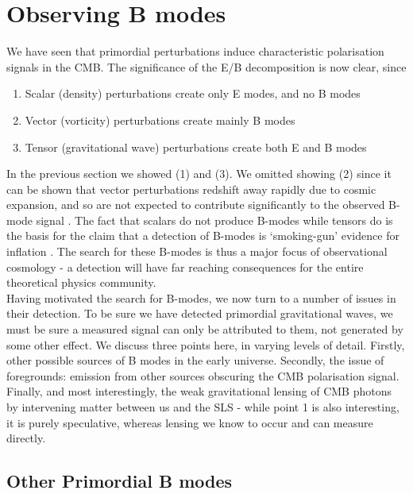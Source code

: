 \documentclass[a4paper,10pt]{article}
\begin{document}
\newpage
\section{Observing B modes}


We have seen that primordial perturbations induce characteristic polarisation signals in the CMB. The significance of the E/B decomposition is now clear, since

\begin{enumerate}
\item Scalar (density) perturbations create only E modes, and no B modes
\item Vector (vorticity) perturbations create mainly B modes
\item Tensor (gravitational wave) perturbations create both E and B modes
\end{enumerate}

In the previous section we showed (1) and (3). We omitted showing (2) since it can be shown that vector perturbations redshift away rapidly due to cosmic expansion, and so are not expected to contribute significantly to the observed B-mode signal  \cite{vector}. The fact that scalars do not produce B-modes while tensors do is the basis for the claim that a detection of B-modes is `smoking-gun'  evidence for inflation \cite{smokinggun}. The search for these B-modes is thus a major focus of observational cosmology - a detection will have far reaching consequences for the entire theoretical physics community. \\

Having motivated the search for B-modes, we now turn to a number of issues in their detection. To be sure we have detected primordial gravitational waves, we must be sure a measured signal can only be attributed to them, not generated by some other effect. We discuss three points here, in varying levels of detail. Firstly, other possible sources of B modes in the early universe. Secondly, the issue of foregrounds: emission from other sources obscuring the CMB polarisation signal. Finally, and most interestingly, the weak gravitational lensing of CMB photons by intervening matter between us and the SLS - while point 1 is also interesting, it is purely speculative, whereas lensing we know to occur and can measure directly.


\subsection{Other Primordial B modes}
\label{vectorissues}
\end{document}
